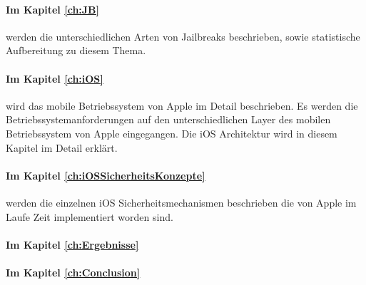 \paragraph{Im Kapitel \ref{ch:JB}} werden die unterschiedlichen Arten von Jailbreaks beschrieben, sowie statistische Aufbereitung zu diesem Thema.

\paragraph{Im Kapitel \ref{ch:iOS}} wird das mobile Betriebssystem von Apple im Detail beschrieben. Es werden die Betriebssystemanforderungen auf den unterschiedlichen Layer des mobilen Betriebssystem von Apple eingegangen. Die iOS Architektur wird in diesem Kapitel im Detail erklärt. 

\paragraph{Im Kapitel \ref{ch:iOSSicherheitsKonzepte}} werden die einzelnen iOS Sicherheitsmechanismen beschrieben die von Apple im Laufe Zeit implementiert worden sind.

\paragraph{Im Kapitel \ref{ch:Ergebnisse}}

\paragraph{Im Kapitel \ref{ch:Conclusion}}

